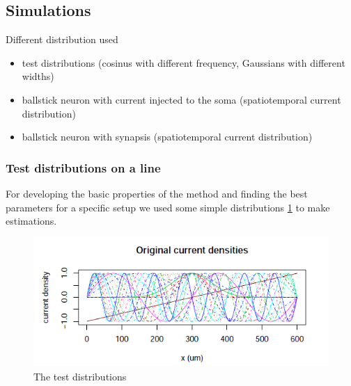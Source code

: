 \documentclass[12pt,a4paper]{article}
\begin{document}

\subsection{Simulations}

Different distribution used
\begin{itemize}
\item test distributions (cosinus with different frequency, Gaussians with different widths)
\item ballstick neuron with current injected to the soma (spatiotemporal current distribution)
\item ballstick neuron with synapsis (spatiotemporal current distribution)
\end{itemize}



\subsubsection{Test distributions on a line}
For developing the basic properties of the method and finding the best parameters for a specific setup we used some simple distributions \ref{fig:distribution} to make estimations.

\begin{figure}[h]
\centering
\includegraphics[width= 10 cm]{plots/distributions.png}
\caption{The test distributions}
\label{fig:distribution}
\end{figure}
\end{document}
